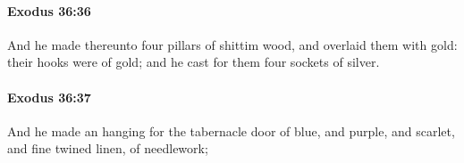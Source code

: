 		\paragraph{Exodus 36:36} %
			\label{EXODUS-36-36}

			And he made thereunto four pillars of shittim wood, and overlaid them with gold: their hooks were of gold; and he cast for them four sockets of silver.


		\paragraph{Exodus 36:37} %
			\label{EXODUS-36-37}

			And he made an hanging for the tabernacle door of blue, and purple, and scarlet, and fine twined linen, of needlework;


